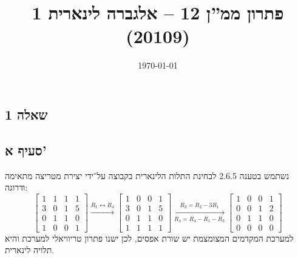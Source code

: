 \documentclass[a4paper, 10pt]{article}
\title{פתרון ממ''ן 12 – אלגברה לינארית 1 (20109)}
\author{\AUTHOR}
\date{\today}
\begin{document}
\begin{hebrew}
	\maketitle
	\section{שאלה 1}
	\subsection{סעיף א'}
	נשתמש בטענה 2.6.5 לבחינת התלות הלינארית בקבוצה על־ידי יצירת מטריצה מתאימה ודרוגה:
	\[
		\begin{bmatrix}
			1 & 1 & 1 & 1 \\
			3 & 0 & 1 & 5 \\
			0 & 1 & 1 & 0 \\
			1 & 0 & 0 & 1
		\end{bmatrix}
		\xrightarrow{R_1 \leftrightarrow R_4}
		\begin{bmatrix}
			1 & 0 & 0 & 1 \\
			3 & 0 & 1 & 5 \\
			0 & 1 & 1 & 0 \\
			1 & 1 & 1 & 1
		\end{bmatrix}
		\xrightarrow[R_4 = R_4 - R_1 - R_3]{R_2 = R_2 - 3R_1}
		\begin{bmatrix}
			1 & 0 & 0 & 1 \\
			0 & 0 & 1 & 2 \\
			0 & 1 & 1 & 0 \\
			0 & 0 & 0 & 0
		 \end{bmatrix}
	 \]
	 למערכת המקדמים המצומצמת יש שורת אפסים, לכן ישנו פתרון טריוויאלי למערכת והיא תלויה לינארית.


\end{hebrew}
\end{document}
